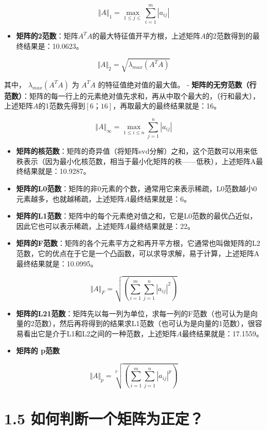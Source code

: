 \documentclass[]{book}
\providecommand{\tightlist}{%
  \setlength{\itemsep}{0pt}\setlength{\parskip}{0pt}}
\begin{document}
\[
\Vert A\Vert_1=\max_{1\le j\le}\sum_{i=1}^m|{a_{ij}}|
\]

\begin{itemize}
\tightlist
\item
  \textbf{矩阵的2范数}：矩阵\(A^TA\)的最大特征值开平方根，上述矩阵\(A\)的2范数得到的最终结果是：10.0623。
\end{itemize}

\[
\Vert A\Vert_2=\sqrt{\lambda_{max}(A^T A)}
\]

其中， \(\lambda_{max}(A^T A)\) 为 \(A^T A\) 的特征值绝对值的最大值。 -
\textbf{矩阵的无穷范数（行范数）}：矩阵的每一行上的元素绝对值先求和，再从中取个最大的，（行和最大），上述矩阵\(A\)的1范数先得到\([6；16]\)，再取最大的最终结果就是：16。

\[
\Vert A\Vert_{\infty}=\max_{1\le i \le n}\sum_{j=1}^n |{a_{ij}}|
\]

\begin{itemize}
\item
  \textbf{矩阵的核范数}：矩阵的奇异值（将矩阵svd分解）之和，这个范数可以用来低秩表示（因为最小化核范数，相当于最小化矩阵的秩------低秩），上述矩阵A最终结果就是：10.9287。
\item
  \textbf{矩阵的L0范数}：矩阵的非0元素的个数，通常用它来表示稀疏，L0范数越小0元素越多，也就越稀疏，上述矩阵\(A\)最终结果就是：6。
\item
  \textbf{矩阵的L1范数}：矩阵中的每个元素绝对值之和，它是L0范数的最优凸近似，因此它也可以表示稀疏，上述矩阵\(A\)最终结果就是：22。\\
\item
  \textbf{矩阵的F范数}：矩阵的各个元素平方之和再开平方根，它通常也叫做矩阵的L2范数，它的优点在于它是一个凸函数，可以求导求解，易于计算，上述矩阵A最终结果就是：10.0995。
\end{itemize}

\[
\Vert A\Vert_F=\sqrt{(\sum_{i=1}^m\sum_{j=1}^n{| a_{ij}|}^2)}
\]

\begin{itemize}
\tightlist
\item
  \textbf{矩阵的L21范数}：矩阵先以每一列为单位，求每一列的F范数（也可认为是向量的2范数），然后再将得到的结果求L1范数（也可认为是向量的1范数），很容易看出它是介于L1和L2之间的一种范数，上述矩阵\(A\)最终结果就是：17.1559。
\item
  \textbf{矩阵的 p范数}
\end{itemize}

\[
\Vert A\Vert_p=\sqrt[p]{(\sum_{i=1}^m\sum_{j=1}^n{| a_{ij}|}^p)}
\]

\section{1.5
如何判断一个矩阵为正定？}\label{ux5982ux4f55ux5224ux65adux4e00ux4e2aux77e9ux9635ux4e3aux6b63ux5b9a}
\end{document}
